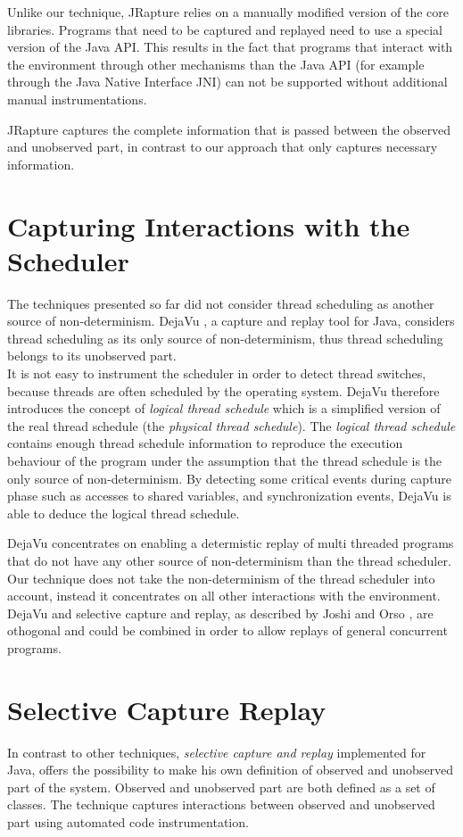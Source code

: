 Unlike our technique, JRapture relies on a manually modified version of the core libraries. Programs that need to be captured and replayed need to use a special version of the Java API.  This results in the fact that programs that interact with the environment through other mechanisms than the Java API (for example through the Java Native Interface JNI) can not be supported without additional manual instrumentations.

JRapture captures the complete information that is passed between the observed and unobserved part, in contrast to our approach that only captures necessary information.

\section {Capturing Interactions with the Scheduler}
The techniques presented so far did not consider thread scheduling as another source of non-determinism. DejaVu \cite{dejavu}, a capture and replay tool for Java, considers thread scheduling as its only source of non-determinism, thus thread scheduling belongs to its unobserved part.\\
It is not easy to instrument the scheduler in order to detect thread switches, because threads are often scheduled by the operating system. DejaVu therefore introduces the concept of \emph{logical thread schedule} which is a simplified version of the real thread schedule (the \emph{physical thread schedule}). The \emph{logical thread schedule} contains enough thread schedule information to reproduce the execution behaviour of the program under the assumption that the thread schedule is the only source of non-determinism. By detecting some critical events during capture phase such as accesses to shared variables, and synchronization events, DejaVu is able to deduce the logical thread schedule.

DejaVu concentrates on enabling a determistic replay of multi threaded programs that do not have any other source of non-determinism than the thread scheduler. Our technique does not take the non-determinism of the thread scheduler into account, instead it concentrates on all other interactions with the environment. DejaVu and selective capture and replay, as described by Joshi and Orso \cite{orso05may, orso06}, are othogonal and could be combined in order to allow replays of general concurrent programs. 

\section{Selective Capture Replay}
In contrast to other techniques, \emph{selective capture and replay} \cite{orso05may} implemented for Java, offers the possibility to make his own definition of observed and unobserved part of the system. Observed and unobserved part are both defined as a set of classes. The technique captures interactions between observed and unobserved part using automated code instrumentation.

